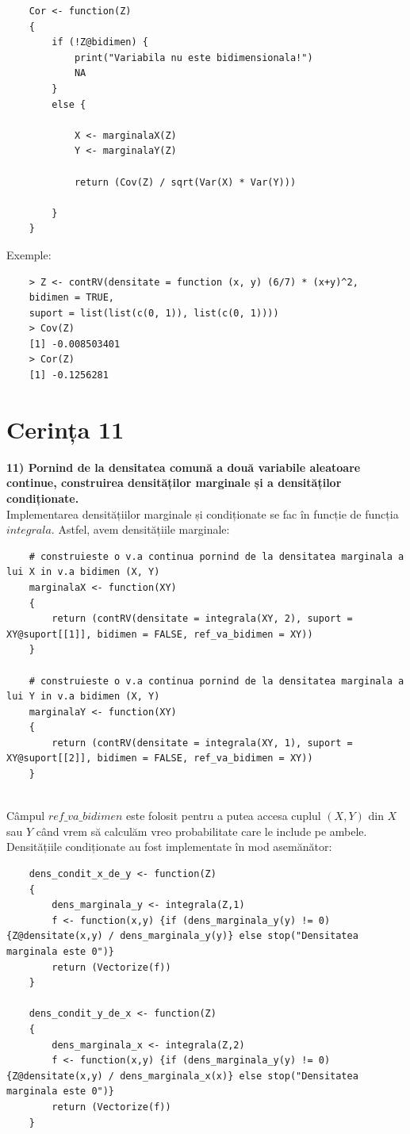 \documentclass[12pt]{article}
\begin{document}
\begin{lstlisting}
	Cor <- function(Z)
	{
		if (!Z@bidimen) {
			print("Variabila nu este bidimensionala!")
			NA
		}
		else {
			
			X <- marginalaX(Z)
			Y <- marginalaY(Z)
			
			return (Cov(Z) / sqrt(Var(X) * Var(Y)))
			
		}
	}
\end{lstlisting}\vspace*{2\baselineskip}

Exemple:
\begin{lstlisting}
	> Z <- contRV(densitate = function (x, y) (6/7) * (x+y)^2,
	bidimen = TRUE,
	suport = list(list(c(0, 1)), list(c(0, 1))))
	> Cov(Z)
	[1] -0.008503401
	> Cor(Z)
	[1] -0.1256281
\end{lstlisting} \pagebreak
\section{Cerința 11}
\textbf{11) Pornind  de  la  densitatea  comună  a  două  variabile  aleatoare  continue,  construirea densităților marginale și a densităților condiționate.} \hfill \\
\indent Implementarea densitățiilor marginale și condiționate se fac în funcție de funcția $integrala$. Astfel, avem densitățiile marginale:
\begin{lstlisting}
	# construieste o v.a continua pornind de la densitatea marginala a lui X in v.a bidimen (X, Y)
	marginalaX <- function(XY)
	{
		return (contRV(densitate = integrala(XY, 2), suport = XY@suport[[1]], bidimen = FALSE, ref_va_bidimen = XY))
	}
	
	# construieste o v.a continua pornind de la densitatea marginala a lui Y in v.a bidimen (X, Y)
	marginalaY <- function(XY)
	{
		return (contRV(densitate = integrala(XY, 1), suport = XY@suport[[2]], bidimen = FALSE, ref_va_bidimen = XY))
	}
\end{lstlisting} \hfill \\
\indent Câmpul $ref\_va\_bidimen$ este folosit pentru a putea accesa cuplul $(X, Y)$ din $X$ sau $Y$ când vrem să calculăm vreo probabilitate care le include pe ambele. \\
\indent Densitățiile condiționate au fost implementate în mod asemănător:
\begin{lstlisting}
	dens_condit_x_de_y <- function(Z)
	{
		dens_marginala_y <- integrala(Z,1)
		f <- function(x,y) {if (dens_marginala_y(y) != 0) {Z@densitate(x,y) / dens_marginala_y(y)} else stop("Densitatea marginala este 0")}
		return (Vectorize(f))
	}
	
	dens_condit_y_de_x <- function(Z)
	{
		dens_marginala_x <- integrala(Z,2)
		f <- function(x,y) {if (dens_marginala_y(y) != 0) {Z@densitate(x,y) / dens_marginala_x(x)} else stop("Densitatea marginala este 0")}
		return (Vectorize(f))
	}
\end{lstlisting} \pagebreak
\end{document}
